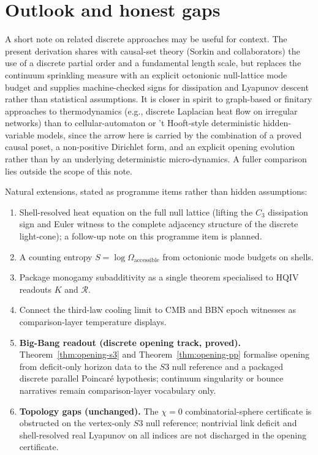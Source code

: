 \documentclass[11pt]{amsart}
\begin{document}
\section{Outlook and honest gaps}
\label{sec:outlook}

A short note on related discrete approaches may be useful for context.  The present
derivation shares with causal-set theory (Sorkin and collaborators) the use of a
discrete partial order and a fundamental length scale, but replaces the continuum
sprinkling measure with an explicit octonionic null-lattice mode budget and supplies
machine-checked signs for dissipation and Lyapunov descent rather than statistical
assumptions.  It is closer in spirit to graph-based or finitary approaches to
thermodynamics (e.g., discrete Laplacian heat flow on irregular networks) than to
cellular-automaton or 't Hooft-style deterministic hidden-variable models, since the
arrow here is carried by the combination of a proved causal poset, a non-positive
Dirichlet form, and an explicit opening evolution rather than by an underlying
deterministic micro-dynamics.  A fuller comparison lies outside the scope of this
note.

Natural extensions, stated as programme items rather than hidden assumptions:

\begin{enumerate}[leftmargin=2em]
\item Shell-resolved heat equation on the full null lattice (lifting the $C_3$
  dissipation sign and Euler witness to the complete adjacency structure of the
  discrete light-cone); a follow-up note on this programme item is planned.
\item A counting entropy $S=\log\Omega_{\mathrm{accessible}}$ from octonionic mode budgets on shells.
\item Package monogamy subadditivity as a single theorem specialised to HQIV readouts
  $K$ and $\mathcal{R}$.
\item Connect the third-law cooling limit to CMB and BBN epoch witnesses
  \cite{hqiv-bbn-paper} as comparison-layer temperature displays.
\item \textbf{Big-Bang readout (discrete opening track, proved).}
  Theorem~\ref{thm:opening-s3} and Theorem~\ref{thm:opening-pp} formalise opening from
  deficit-only horizon data to the $S3$ null reference and a packaged
  discrete parallel Poincar\'e hypothesis; continuum singularity or bounce narratives
  remain comparison-layer vocabulary only.
\item \textbf{Topology gaps (unchanged).}
  The $\chi=0$ combinatorial-sphere certificate is obstructed on the vertex-only
  $S3$ null reference; nontrivial link deficit and shell-resolved real Lyapunov on
  all indices are not discharged in the opening certificate.
\end{enumerate}
\end{document}

